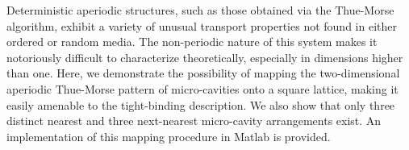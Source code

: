 Deterministic aperiodic structures, such as those obtained via the Thue-Morse algorithm, exhibit a variety of unusual transport properties not found in either ordered or random media. The non-periodic nature of this system makes it notoriously difficult to characterize theoretically, especially in dimensions higher than one. Here, we demonstrate the possibility of mapping the two-dimensional aperiodic Thue-Morse pattern of micro-cavities onto a square lattice, making it easily amenable to the tight-binding description. We also show that only three distinct nearest and three next-nearest micro-cavity arrangements exist. An implementation of this mapping procedure in Matlab is provided. 
% 
% 

